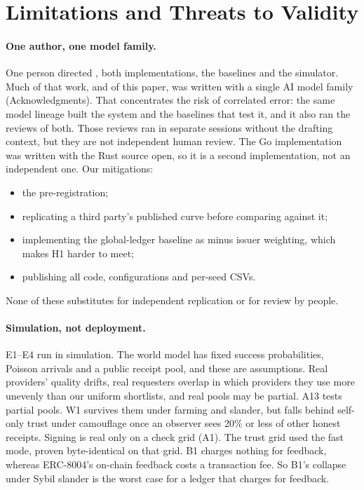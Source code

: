 \section{Limitations and Threats to Validity}
\label{sec:limitations}

\paragraph{One author, one model family.}
One person directed \sys{}, both implementations, the baselines and the
simulator. Much of that work, and of this paper, was written with a
single AI model family (Acknowledgments). That concentrates the risk of
correlated error: the same model lineage built the system and the
baselines that test it, and it also ran the reviews of both. Those
reviews ran in separate sessions without the drafting context, but they
are not independent human review. The Go implementation was written with
the Rust source open, so it is a second implementation, not an
independent one. Our mitigations:
\begin{itemize}
\item the pre-registration;
\item replicating a third party's published curve before comparing
  against it;
\item implementing the global-ledger baseline as \sys{} minus issuer
  weighting, which makes H1 harder to meet;
\item publishing all code, configurations and per-seed CSVs.
\end{itemize}
None of these substitutes for independent replication or for review by people.

\paragraph{Simulation, not deployment.}
E1--E4 run in simulation. The world model has fixed success probabilities,
Poisson arrivals and a public receipt pool, and these are assumptions.
Real providers' quality drifts, real requesters overlap in which providers
they use more unevenly than our uniform shortlists, and real pools may be
partial. A13 tests partial pools. W1 survives them under farming and
slander, but falls behind self-only trust under camouflage once an
observer sees 20\% or less of other honest receipts. Signing is real only on a check grid (A1). The trust grid used
the fast mode, proven byte-identical on that grid. B1 charges nothing for
feedback, whereas ERC-8004's on-chain feedback costs a transaction fee. So
B1's collapse under Sybil slander is the worst case for a ledger that
charges for feedback.

